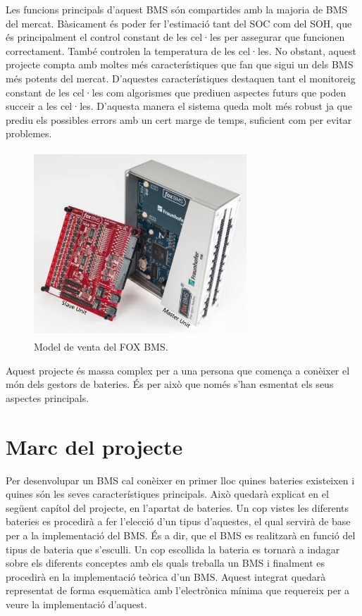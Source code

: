 Les funcions principals d'aquest BMS són compartides amb la majoria de BMS del mercat. Bàsicament és poder fer l'estimació tant del SOC com del SOH, que és principalment el control constant de les cel·les per assegurar que funcionen correctament. També controlen la temperatura de les cel·les. No obstant, aquest projecte compta amb moltes més característiques que fan que sigui un dels BMS més potents del mercat. \newline D'aquestes característiques destaquen tant el monitoreig constant de les cel·les com algorismes que prediuen aspectes futurs que poden succeir a les cel·les. D'aquesta manera el sistema queda molt més robust ja que prediu els possibles errors amb un cert marge de temps, suficient com per evitar problemes. 
\bigskip
\begin{figure}[H]
		\centering
   	\includegraphics[width=8cm, height=7cm]{Marcteoric/foxbmsimatge.png}
     	\caption{Model de venta del FOX BMS.} 
\end{figure}

Aquest projecte és massa complex per a una persona que comença a \newline conèixer el món dels gestors de bateries. És per això que només s'han esmentat els seus aspectes principals. 

\section{Marc del projecte}
Per desenvolupar un BMS cal conèixer en primer lloc quines bateries existeixen i quines són les seves característiques principals. Això quedarà explicat en el següent capítol del projecte, en l'apartat de bateries. Un cop vistes les diferents bateries es procedirà a fer l'elecció d'un tipus d'aquestes, el qual servirà de base per a la implementació del BMS. És a dir, que el BMS es realitzarà en funció del tipus de bateria que s'esculli. Un cop escollida la bateria es tornarà a indagar sobre els diferents conceptes amb els quals treballa un BMS i finalment es procedirà en la implementació teòrica d'un BMS. Aquest integrat quedarà representat de forma esquemàtica amb \newline l'electrònica mínima que requereix per a veure la implementació d'aquest. 

